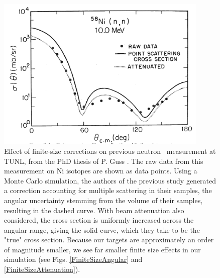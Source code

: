 \begin{figure}[ht!]
    \begin{center}
        \includegraphics[width = 0.9\textwidth]{figures/GussFiniteSizeEffect.png}
        \caption[Effect of finite-size corrections on previous neutron \el\ measurement at
        TUNL]
        {
            Effect of finite-size corrections on previous neutron \el\ measurement at
            TUNL, from the PhD thesis of P. Guss \cite{GussPhDThesis}.
            The raw data from this measurement on Ni isotopes are shown as data
            points. Using a Monte Carlo simulation, the authors of the previous
            study generated a correction accounting for multiple scattering in
            their samples, the angular uncertainty stemming from the volume
            of their samples, resulting in the dashed curve. With beam
            attenuation also considered, the cross section is uniformly
            increased across the angular range, giving the solid curve, which
            they take to be the "true" cross section. Because our targets are
            approximately an order of magnitude smaller, we see far smaller
            finite size effects in our simulation (see Figs.
            \ref{FiniteSizeAngular} and \ref{FiniteSizeAttenuation}).
        }
        \label{GussFiniteSizeEffect}
    \end{center}
\end{figure}

